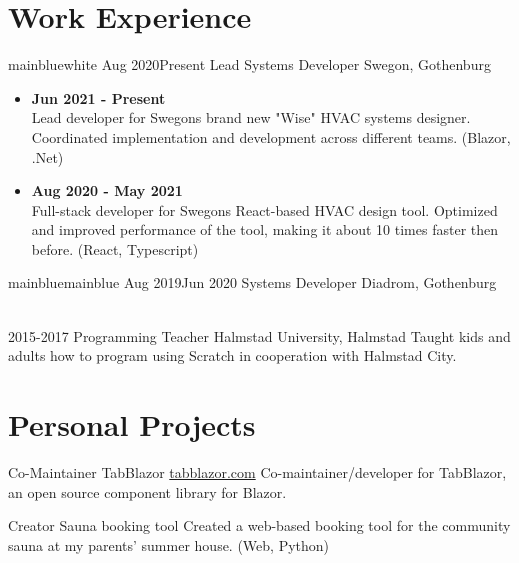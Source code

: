 \documentclass[a4paper]{twentysecondcv} %
\begin{document}
\section{Work Experience}
\begin{twenty} %
    \twentyitemtime
    {mainblue}{white}
    {Aug 2020}{Present}
    {Lead Systems Developer}
    {Swegon, Gothenburg}
    {\begin{itemize}
        \setlength\itemsep{.5em}
        \item {\textbf{Jun 2021 - Present}\\Lead developer for Swegons brand new "Wise" HVAC systems designer. Coordinated implementation and development across different teams. (Blazor, .Net)}
        \item {\textbf{Aug 2020 - May 2021}\\Full-stack developer for Swegons React-based HVAC design tool. Optimized and improved performance of the tool, making it about 10 times faster then before. (React, Typescript)}
    \end{itemize}}
    
    \twentyitemtime
    {mainblue}{mainblue}
    {Aug 2019}{Jun 2020}
    {Systems Developer}
    {Diadrom, Gothenburg}
    {}
    
    \\
    
    \twentyitem
    {2015-2017}
    {Programming Teacher}
    {Halmstad University, Halmstad}
    {Taught kids and adults how to program using Scratch in cooperation with Halmstad City.}
\end{twenty}


\section{Personal Projects}
\begin{twenty}
    \twentyitem
    {Co-Maintainer}
    {TabBlazor}
    {\href{http://tabblazor.com}{tabblazor.com}}
    {Co-maintainer/developer for TabBlazor, an open source component library for Blazor.}
    
    \twentyitem
    {Creator}
    {Sauna booking tool}
    {}
    {Created a web-based booking tool for the community sauna at my parents' summer house. (Web, Python)}
\end{twenty}
\end{document}
